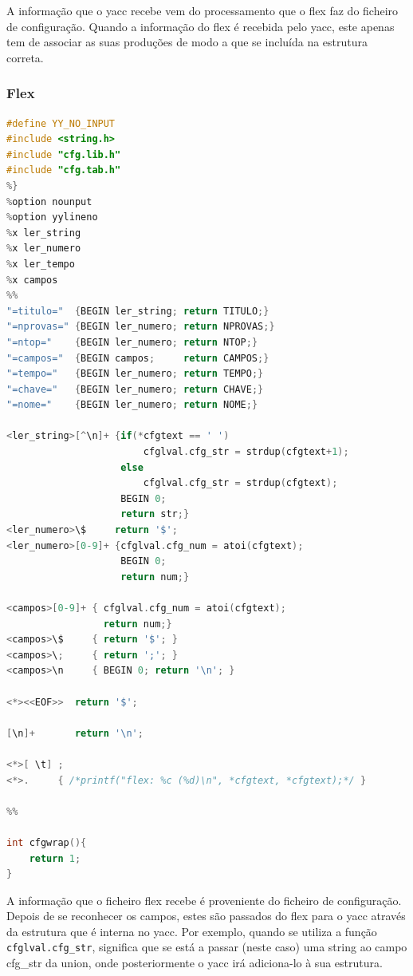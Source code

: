 \documentclass[11pt, a4paper, oneside]{article}
\begin{document}
A informação que o \textsf{yacc} recebe vem do processamento que o \textsf{flex} faz do ficheiro de configuração.
Quando a informação do \textsf{flex} é recebida pelo \textsf{yacc}, este apenas tem de associar as suas produções de modo a que se incluída na estrutura correta.

\newpage
\subsubsection{\textsf{Flex}}

\begin{lstlisting}[language=C, caption={Flex utilizado para o tratamento do ficheiro de configuração.}] 
%{
#define YY_NO_INPUT
#include <string.h>
#include "cfg.lib.h"
#include "cfg.tab.h"
%}
%option nounput
%option yylineno
%x ler_string
%x ler_numero
%x ler_tempo
%x campos
%%
"=titulo="  {BEGIN ler_string; return TITULO;}
"=nprovas=" {BEGIN ler_numero; return NPROVAS;}
"=ntop="    {BEGIN ler_numero; return NTOP;}
"=campos="  {BEGIN campos;     return CAMPOS;}
"=tempo="   {BEGIN ler_numero; return TEMPO;}
"=chave="   {BEGIN ler_numero; return CHAVE;}
"=nome="    {BEGIN ler_numero; return NOME;}

<ler_string>[^\n]+ {if(*cfgtext == ' ')
                        cfglval.cfg_str = strdup(cfgtext+1);
                    else
                        cfglval.cfg_str = strdup(cfgtext);
                    BEGIN 0;
                    return str;}
<ler_numero>\$     return '$';
<ler_numero>[0-9]+ {cfglval.cfg_num = atoi(cfgtext);
                    BEGIN 0;
                    return num;}

<campos>[0-9]+ { cfglval.cfg_num = atoi(cfgtext);
                 return num;}
<campos>\$     { return '$'; }
<campos>\;     { return ';'; }
<campos>\n     { BEGIN 0; return '\n'; }

<*><<EOF>>  return '$';

[\n]+       return '\n';

<*>[ \t] ;
<*>.     { /*printf("flex: %c (%d)\n", *cfgtext, *cfgtext);*/ }

%%

int cfgwrap(){
    return 1;
}
\end{lstlisting}

A informação que o ficheiro \textsf{flex} recebe é proveniente do ficheiro de configuração.
Depois de se reconhecer os campos, estes são passados do \textsf{flex} para o \textsf{yacc} através da estrutura que é interna no \textsf{yacc}.
Por exemplo, quando se utiliza a função \texttt{cfglval.cfg\_str}, significa que se está a passar (neste caso) uma string ao campo cfg\_str da union, onde posteriormente o \textsf{yacc} irá adiciona-lo à sua estrutura.
\newpage
\end{document}
